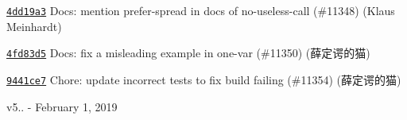 \begin{DoxyItemize}
\item \href{https://github.com/eslint/eslint/commit/4dd19a3c4c037adc860a65e96f2ba3eeccace1de}{\texttt{ {\ttfamily 4dd19a3}}} Docs\+: mention \textquotesingle{}prefer-\/spread\textquotesingle{} in docs of \textquotesingle{}no-\/useless-\/call\textquotesingle{} (\#11348) (Klaus Meinhardt)
\item \href{https://github.com/eslint/eslint/commit/4fd83d5ec47a6a7b81cd8801c3bd63d27ea1c7c4}{\texttt{ {\ttfamily 4fd83d5}}} Docs\+: fix a misleading example in one-\/var (\#11350) (薛定谔的猫)
\item \href{https://github.com/eslint/eslint/commit/9441ce77b7228f2c4562e158a10905afe11f31f2}{\texttt{ {\ttfamily 9441ce7}}} Chore\+: update incorrect tests to fix build failing (\#11354) (薛定谔的猫)
\end{DoxyItemize}

v5.. -\/ February 1, 2019


